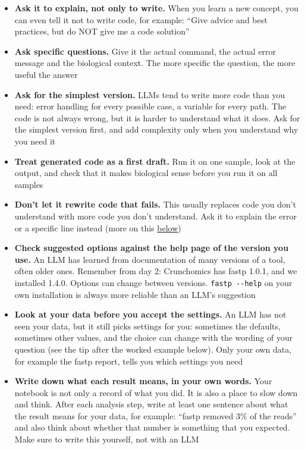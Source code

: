 \documentclass[
  letterpaper,
  DIV=11,
  numbers=noendperiod]{scrreprt}
\providecommand{\tightlist}{%
  \setlength{\itemsep}{0pt}\setlength{\parskip}{0pt}}
\begin{document}
\begin{itemize}
\tightlist
\item
  \textbf{Ask it to explain, not only to write.} When you learn a new
  concept, you can even tell it not to write code, for example: ``Give
  advice and best practices, but do NOT give me a code solution''
\item
  \textbf{Ask specific questions.} Give it the actual command, the
  actual error message and the biological context. The more specific the
  question, the more useful the answer
\item
  \textbf{Ask for the simplest version.} LLMs tend to write more code
  than you need: error handling for every possible case, a variable for
  every path. The code is not always wrong, but it is harder to
  understand what it does. Ask for the simplest version first, and add
  complexity only when you understand why you need it
\item
  \textbf{Treat generated code as a first draft.} Run it on one sample,
  look at the output, and check that it makes biological sense before
  you run it on all samples
\item
  \textbf{Don't let it rewrite code that fails.} This usually replaces
  code you don't understand with more code you don't understand. Ask it
  to explain the error or a specific line instead (more on this
  \hyperref[when-your-code-does-not-work]{below})
\item
  \textbf{Check suggested options against the help page of the version
  you use.} An LLM has learned from documentation of many versions of a
  tool, often older ones. Remember from day 2: Crunchomics has fastp
  1.0.1, and we installed 1.4.0. Options can change between versions.
  \texttt{fastp\ -\/-help} on your own installation is always more
  reliable than an LLM's suggestion
\item
  \textbf{Look at your data before you accept the settings.} An LLM has
  not seen your data, but it still picks settings for you: sometimes the
  defaults, sometimes other values, and the choice can change with the
  wording of your question (see the tip after the worked example below).
  Only your own data, for example the fastp report, tells you which
  settings you need
\item
  \textbf{Write down what each result means, in your own words.} Your
  notebook is not only a record of what you did. It is also a place to
  slow down and think. After each analysis step, write at least one
  sentence about what the result means for your data, for example:
  ``fastp removed 3\% of the reads'' and also think about whether that
  number is something that you expected. Make sure to write this
  yourself, not with an LLM
\end{itemize}
\end{document}
